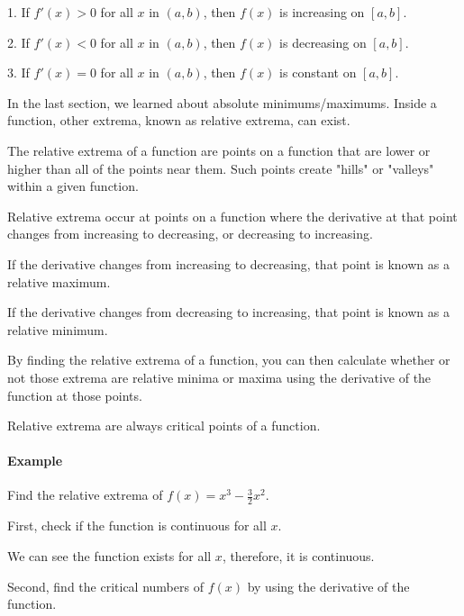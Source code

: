 1. If $f'(x) > 0$ for all $x$ in $(a,b)$, then $f(x)$ is increasing on $[a,b]$.

2. If $f'(x) < 0$ for all $x$ in $(a,b)$, then $f(x)$ is decreasing on $[a,b]$.

3. If $f'(x) = 0$ for all $x$ in $(a,b)$, then $f(x)$ is constant on $[a,b]$.



In the last section, we learned about absolute minimums/maximums. Inside a function, other extrema, known as relative extrema, can exist.



The relative extrema of a function are points on a function that are lower or higher than all of the points near them. Such points create "hills" or "valleys" within a given function.



Relative extrema occur at points on a function where the derivative at that point changes from increasing to decreasing, or decreasing to increasing.



If the derivative changes from increasing to decreasing, that point is known as a relative maximum.



If the derivative changes from decreasing to increasing, that point is known as a relative minimum.



By finding the relative extrema of a function, you can then calculate whether or not those extrema are relative minima or maxima using the derivative of the function at those points.



Relative extrema are always critical points of a function.



\paragraph{Example}



Find the relative extrema of $f(x) = x^3 - \frac{3}{2}x^2$.



First, check if the function is continuous for all $x$.



We can see the function exists for all $x$, therefore, it is continuous.



Second, find the critical numbers of $f(x)$ by using the derivative of the function.



